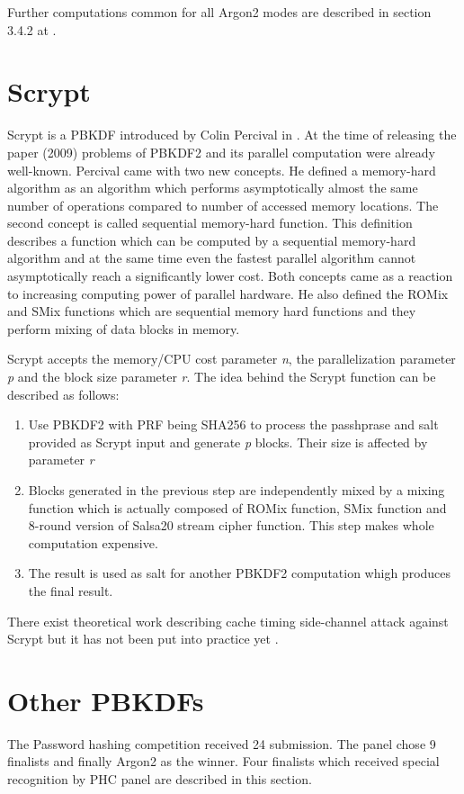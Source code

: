 \documentclass[nolof]{fithesis3}
\begin{document}
Further computations common for all Argon2 modes are described in section 3.4.2 at \parencite{argon2draft}.

\section{Scrypt}
\label{sec:scrypt}
Scrypt is a PBKDF introduced by Colin Percival in \parencite{memoryhard}. At the time of releasing the paper (2009) problems of PBKDF2 and its parallel computation were already well-known. Percival came with two new concepts. He defined a memory-hard algorithm as an algorithm which performs asymptotically almost the same number of operations compared to number of accessed memory locations. The second concept is called sequential memory-hard function. This definition describes a function which can be computed by a sequential memory-hard algorithm and at the same time even the fastest parallel algorithm cannot asymptotically reach a significantly lower cost. Both concepts came as a reaction to increasing computing power of parallel hardware. He also defined the ROMix and SMix functions which are sequential memory hard functions and they perform mixing of data blocks in memory.

Scrypt accepts the memory/CPU cost parameter \emph{n}, the parallelization parameter \emph{p} and the block size parameter \emph{r}. The idea behind the Scrypt function can be described as follows:

\begin{enumerate}
\item Use PBKDF2 with PRF being SHA256 to process the passhprase and salt provided as Scrypt input and generate \emph{p} blocks. Their size is affected by parameter \emph{r}

\item Blocks generated in the previous step are independently mixed by a mixing function which is actually composed of ROMix function, SMix function and 8-round version of  Salsa20 stream cipher function. This step makes whole computation expensive.

\item The result is used as salt for another PBKDF2 computation whigh produces the final result.
\end{enumerate}

There exist theoretical work describing cache timing side-channel attack against Scrypt but it has not been put into practice yet \parencite{scryptattack}.

\section{Other PBKDFs}
The Password hashing competition received 24 submission. The panel chose 9 finalists and finally Argon2 as the winner. Four finalists which received special recognition by PHC panel are described in this section.
\end{document}

